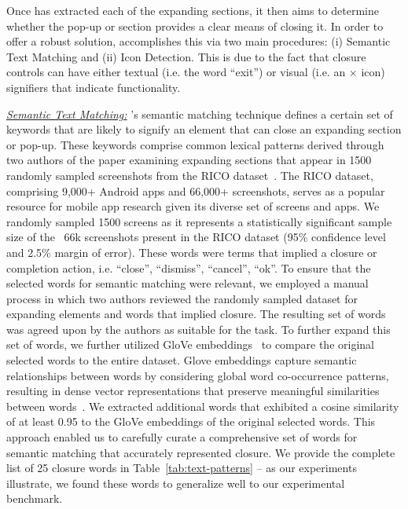 Once \MotorEase has extracted each of the expanding sections, it then aims to determine whether the pop-up or section provides a clear means of closing it. In order to offer a robust solution, \MotorEase accomplishes this via two main procedures: (i) Semantic Text Matching and (ii) Icon Detection. This is due to the fact that closure controls can have either textual (i.e. the word ``exit'') or visual (i.e. an $\times$ icon) signifiers that indicate functionality.

\noindent\emph{\underline{Semantic Text Matching:}} \MotorEase's semantic matching technique defines a certain set of keywords that are likely to signify an element that can close an expanding section or pop-up.  
These keywords comprise common lexical patterns derived through two authors of the paper examining expanding sections that appear in 1500 randomly sampled screenshots from the RICO dataset~\cite{Deka:UIST'17}. The RICO dataset, comprising 9,000+ Android apps and 66,000+ screenshots, serves as a popular resource for mobile app research given its diverse set of screens and apps. We randomly sampled 1500 screens as it represents a statistically significant sample size of the ~66k screenshots present in the RICO dataset (95\% confidence level and 2.5\% margin of error). These words were terms that implied a closure or completion action, i.e. ``close'', ``dismiss'', ``cancel'', ``ok''. To ensure that the selected words for semantic matching were relevant, we employed a manual process in which two authors reviewed the randomly sampled dataset for expanding elements and words that implied closure. The resulting set of words was agreed upon by the authors as suitable for the task. To further expand this set of words, we further utilized GloVe embeddings~\cite{glove} to compare the original selected words to the entire dataset. Glove embeddings capture semantic relationships between words by considering global word co-occurrence patterns, resulting in dense vector representations that preserve meaningful similarities between words~\cite{glove}. We extracted additional words that exhibited a cosine similarity of at least 0.95 to the GloVe embeddings of the original selected words. This approach enabled us to carefully curate a comprehensive set of words for semantic matching that accurately represented closure. We provide the complete list of 25 closure words in Table~\ref{tab:text-patterns} -- as our experiments illustrate, we found these words to generalize well to our experimental benchmark. %

